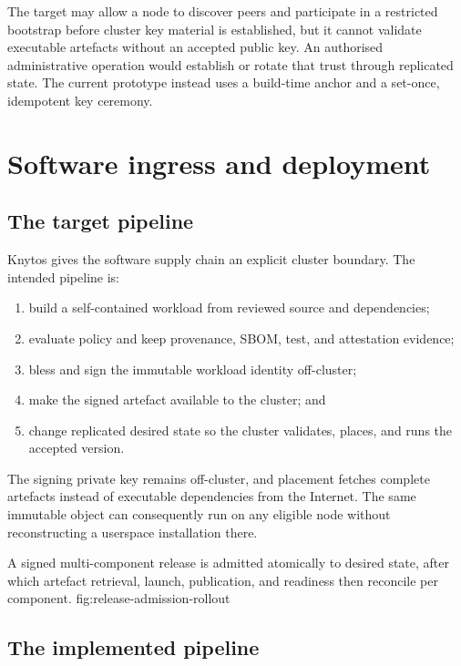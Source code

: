 The target may allow a node to discover peers and participate in a restricted
bootstrap before cluster key material is established, but it cannot validate
executable artefacts without an accepted public key. An authorised
administrative operation would establish or rotate that trust through
replicated state. The current prototype instead uses a build-time anchor and
a set-once, idempotent key ceremony.

\section{Software ingress and deployment}

\subsection{The target pipeline}

Knytos gives the software supply chain an explicit cluster boundary. The
intended pipeline is:

\begin{enumerate}
    \item build a self-contained workload from reviewed source and
        dependencies;
    \item evaluate policy and keep provenance, SBOM, test, and attestation
        evidence;
    \item bless and sign the immutable workload identity off-cluster;
    \item make the signed artefact available to the cluster; and
    \item change replicated desired state so the cluster validates, places,
        and runs the accepted version.
\end{enumerate}

The signing private key remains off-cluster, and placement fetches complete
artefacts instead of executable dependencies from the Internet. The same
immutable object can consequently run on any eligible node without
reconstructing a userspace installation there.

    {A signed multi-component release is admitted atomically to desired state, after which
    artefact retrieval, launch, publication, and readiness then reconcile per
    component.}
    {fig:release-admission-rollout}

\subsection{The implemented pipeline}

